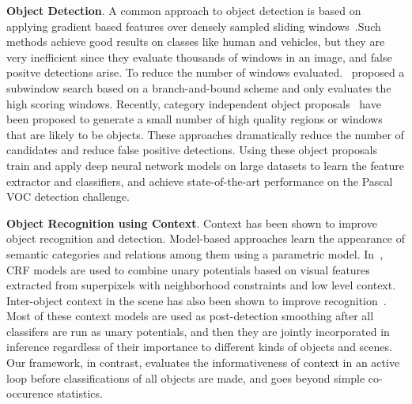 {\bf Object Detection}. 
A common approach to object detection is based on applying gradient based features over densely sampled sliding windows~\cite{felzenszwalb2010object}.Such methods achieve good results on classes like human and vehicles, but they are very inefficient since they evaluate thousands of windows in an image, and false positve detections arise. To reduce the number of windows evaluated.~\cite{lampert2009efficient} proposed a subwindow search based on a branch-and-bound scheme and only evaluates the high scoring windows. Recently, category independent object proposals~\cite{carreira2012cpmc,van2011segmentation,arbelaez2014multiscale} have been proposed to generate a small number of high quality regions or windows that are likely to be objects. These approaches dramatically reduce the number of candidates and reduce false positive detections. Using these object proposals~\cite{girshick14CVPR, BharathECCV2014} train and apply deep neural network models on large datasets to learn the feature extractor and classifiers, and achieve state-of-the-art performance on the Pascal VOC detection challenge. 

{\bf Object Recognition using Context}. 
Context has been shown to improve object recognition and detection. Model-based approaches learn the appearance of semantic categories and relations among them
using a parametric model. In~\cite{gould2009decomposing, galleguillos2010context,mottaghirole, shotton2006textonboost, ladicky2010graph}, CRF models are used to combine unary potentials based on visual features extracted from superpixels with neighborhood constraints and low level context. Inter-object context in the scene has also been shown to improve recognition~\cite{galleguillos2010context, chen2011piecing}. Most of these context models are used as post-detection smoothing after all classifers are run as unary potentials, and then they are jointly incorporated in inference regardless of their importance to different kinds of objects and scenes. Our framework, in contrast, evaluates the informativeness of context in an active loop before classifications of all objects are made, and goes beyond simple co-occurence statistics.
